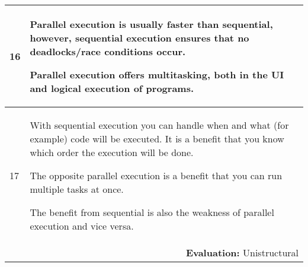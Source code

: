 \begin{longtable}{|p{0.3cm}|p{14.7cm}|}
16 & Parallel execution is usually faster than sequential, however, sequential execution ensures that no deadlocks/race conditions occur.

\noindent Parallel execution offers multitasking, both in the UI and logical execution of programs. \\ \hline

17 & With sequential execution you can handle when and what (for example) code will be executed. It is a benefit that you know which order the execution will be done.

\noindent The opposite parallel execution is a benefit that you can run multiple tasks at once.

\noindent The benefit from sequential is also the weakness of parallel execution and vice versa. \\ \hline

\multicolumn{2}{r}{\textbf{Evaluation:} Unistructural} \\ 

\end{longtable}
\normalsize


